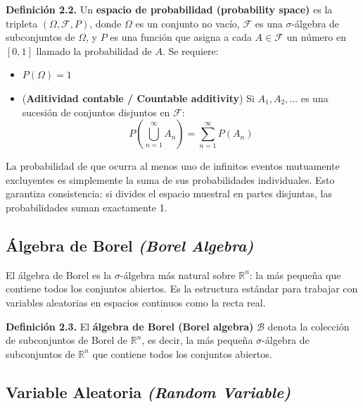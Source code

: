 \documentclass[12pt]{article}
\begin{document}
\textbf{Definici\'on 2.2.} Un \textbf{espacio de probabilidad (probability space)} es la tripleta $(\Omega, \mathcal{F}, P)$, donde $\Omega$ es un conjunto no vac\'io, $\mathcal{F}$ es una $\sigma$-\'algebra de subconjuntos de $\Omega$, y $P$ es una funci\'on que asigna a cada $A \in \mathcal{F}$ un n\'umero en $[0,1]$ llamado la probabilidad de $A$. Se requiere:
\begin{itemize}
  \item $P(\Omega) = 1$
  \item (\textbf{Aditividad contable / Countable additivity}) Si $A_1, A_2, \ldots$ es una sucesi\'on de conjuntos disjuntos en $\mathcal{F}$:
  \begin{equation}
    P\!\left(\bigcup_{n=1}^{\infty} A_n\right) = \sum_{n=1}^{\infty} P(A_n)
  \end{equation}
\end{itemize}

\begin{intuicionmat}
La probabilidad de que ocurra al menos uno de infinitos eventos mutuamente excluyentes es simplemente la suma de sus probabilidades individuales. Esto garantiza consistencia: si divides el espacio muestral en partes disjuntas, las probabilidades suman exactamente 1.
\end{intuicionmat}

\subsection{\'Algebra de Borel \textit{(Borel Algebra)}}

\begin{intuicion}
El \'algebra de Borel es la $\sigma$-\'algebra m\'as natural sobre $\mathbb{R}^n$: la m\'as peque\~na que contiene todos los conjuntos abiertos. Es la estructura est\'andar para trabajar con variables aleatorias en espacios continuos como la recta real.
\end{intuicion}

\textbf{Definici\'on 2.3.} El \textbf{\'algebra de Borel (Borel algebra)} $\mathcal{B}$ denota la colecci\'on de subconjuntos de Borel de $\mathbb{R}^n$, es decir, la m\'as peque\~na $\sigma$-\'algebra de subconjuntos de $\mathbb{R}^n$ que contiene todos los conjuntos abiertos.

\subsection{Variable Aleatoria \textit{(Random Variable)}}
\end{document}
